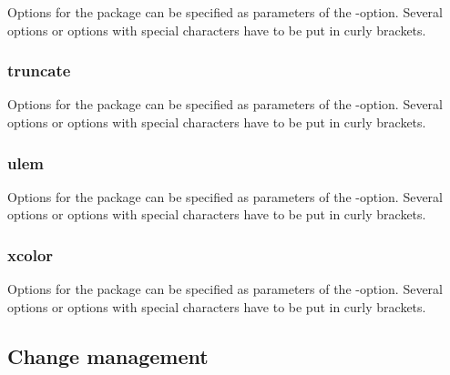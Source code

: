 Options for the  package can be specified as parameters of the -option.
Several options or options with special characters have to be put in curly brackets.




\subsubsection{truncate}


Options for the  package can be specified as parameters of the -option.
Several options or options with special characters have to be put in curly brackets.



\subsubsection{ulem}


Options for the  package can be specified as parameters of the -option.
Several options or options with special characters have to be put in curly brackets.



\subsubsection{xcolor}


Options for the  package can be specified as parameters of the -option.
Several options or options with special characters have to be put in curly brackets.




\subsection{Change management}
\label{sec:ui:changemanagement}

\localtableofcontents

